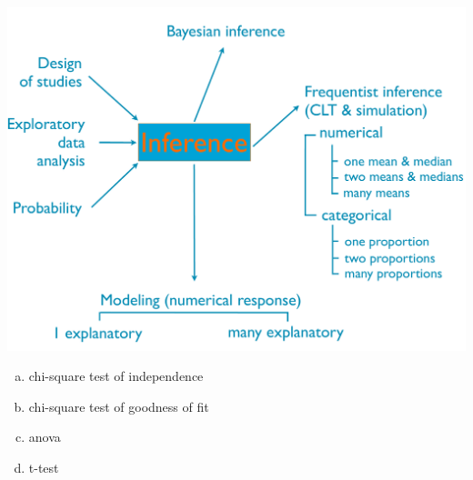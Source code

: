 \documentclass[11pt,containsverbatim,handout,xcolor=xelatex,dvipsnames,table]{beamer}
\newcommand{\solnMult}[1]{#1}
\begin{document}
\begin{frame}

{
{\scriptsize
{}}}
{
 \includegraphics[width=\textwidth]{figures/map/inference}
}

\begin{enumerate}[(a)]
\item \solnMult{chi-square test of independence}
\item chi-square test of goodness of fit
\item anova
\item t-test
\end{enumerate}

\end{frame}

\end{document}
